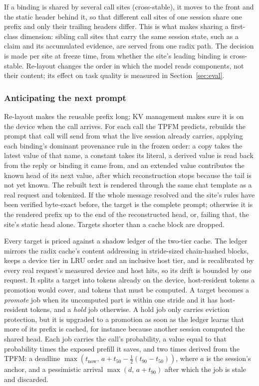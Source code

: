 If a binding is shared by several call sites (cross-stable), it moves to the front and the static header behind it, so that different call sites of one session share one prefix and only their trailing headers differ. This is what makes sharing a first-class dimension: sibling call sites that carry the same session state, such as a claim and its accumulated evidence, are served from one radix path. The decision is made per site at freeze time, from whether the site's leading binding is cross-stable. Re-layout changes the order in which the model reads components, not their content; its effect on task quality is measured in Section~\ref{sec:eval}.

\subsubsection{Anticipating the next prompt}
\label{sec:anticipate}

Re-layout makes the reusable prefix long; KV management makes sure it is on the device when the call arrives. For each call the TPFM predicts, \sysname rebuilds the prompt that call will send from what the live session already carries, applying each binding's dominant provenance rule in the frozen order: a copy takes the latest value of that name, a constant takes its literal, a derived value is read back from the reply or binding it came from, and an extended value contributes the known head of its next value, after which reconstruction stops because the tail is not yet known. The rebuilt text is rendered through the same chat template as a real request and tokenized. If the whole message resolved and the site's rules have been verified byte-exact before, the target is the complete prompt; otherwise it is the rendered prefix up to the end of the reconstructed head, or, failing that, the site's static head alone. Targets shorter than a cache block are dropped.

Every target is priced against a shadow ledger of the two-tier cache. The ledger mirrors the radix cache's content addressing in stride-sized chain-hashed blocks, keeps a device tier in LRU order and an inclusive host tier, and is recalibrated by every real request's measured device and host hits, so its drift is bounded by one request. It splits a target into tokens already on the device, host-resident tokens a promotion would cover, and tokens that must be computed. A target becomes a \emph{promote} job when its uncomputed part is within one stride and it has host-resident tokens, and a \emph{hold} job otherwise. A hold job only carries eviction protection, but it is upgraded to a promotion as soon as the ledger learns that more of its prefix is cached, for instance because another session computed the shared head. Each job carries the call's probability, a value equal to that probability times the exposed prefill it saves, and two times derived from the TPFM: a deadline $\max(t_{\mathrm{now}},\, a + t_{50} - \tfrac{1}{2}(t_{90}-t_{50}))$, where $a$ is the session's anchor, and a pessimistic arrival $\max(d,\, a + t_{90})$ after which the job is stale and discarded.


